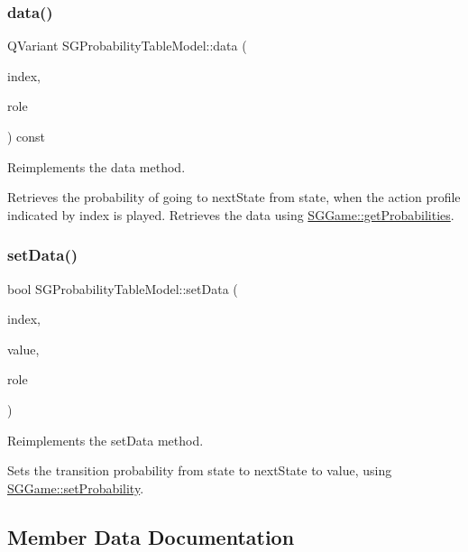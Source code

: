 \subsubsection{\texorpdfstring{data()}{data()}}
{\footnotesize\ttfamily Q\+Variant S\+G\+Probability\+Table\+Model\+::data (\begin{DoxyParamCaption}\item[{const Q\+Model\+Index \&}]{index,  }\item[{int}]{role }\end{DoxyParamCaption}) const}



Reimplements the data method. 

Retrieves the probability of going to next\+State from state, when the action profile indicated by index is played. Retrieves the data using \hyperlink{classSGGame_a0d2fef107bd38ad4c848fd35b0ed5ddf}{S\+G\+Game\+::get\+Probabilities}. \mbox{\label{classSGProbabilityTableModel_a79cad23bdbc109338f525caef8a8cf47}} 
\subsubsection{\texorpdfstring{set\+Data()}{setData()}}
{\footnotesize\ttfamily bool S\+G\+Probability\+Table\+Model\+::set\+Data (\begin{DoxyParamCaption}\item[{const Q\+Model\+Index \&}]{index,  }\item[{const Q\+Variant \&}]{value,  }\item[{int}]{role }\end{DoxyParamCaption})}



Reimplements the set\+Data method. 

Sets the transition probability from state to next\+State to value, using \hyperlink{classSGGame_afcc31eacca8f294d349905d52c9a5f64}{S\+G\+Game\+::set\+Probability}. 

\subsection{Member Data Documentation}
\mbox{\label{classSGProbabilityTableModel_af7619d3adeb71d6ff7f75f78f4b0e34f}} 
